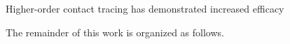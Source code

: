 

Higher-order contact tracing has demonstrated increased efficacy \citep{PozoMartin2023}



%
%




The remainder of this work is organized as follows.